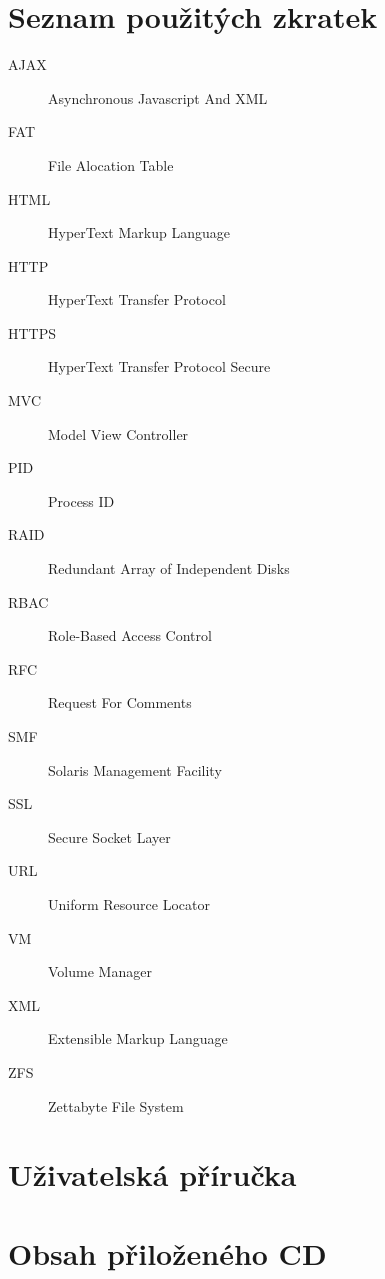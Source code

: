 \documentclass[thesis=B,czech]{FITthesis}[2012/06/26]
\begin{document}
\chapter{Seznam použitých zkratek}
\begin{description}
    \item[AJAX] Asynchronous Javascript And XML
    \item[FAT] File Alocation Table
    \item[HTML] HyperText Markup Language
    \item[HTTP] HyperText Transfer Protocol
    \item[HTTPS] HyperText Transfer Protocol Secure
    \item[MVC] Model View Controller	
    \item[PID] Process ID	
    \item[RAID] Redundant Array of Independent Disks
    \item[RBAC] Role-Based Access Control
    \item[RFC] Request For Comments
    \item[SMF] Solaris Management Facility
    \item[SSL] Secure Socket Layer
    \item[URL] Uniform Resource Locator
    \item[VM] Volume Manager
    \item[XML] Extensible Markup Language
    \item[ZFS] Zettabyte File System
\end{description}

\chapter{Uživatelská příručka}
    

\chapter{Obsah přiloženého CD}


\begin{figure}
\end{figure}
\end{document}
